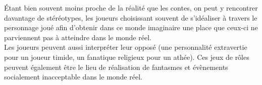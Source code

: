 Étant bien souvent moins proche de la réalité que les contes, on peut y rencontrer davantage de stéréotypes, les joueurs choisissant souvent de s'idéaliser à travers le personnage joué afin d'obtenir dans ce monde imaginaire une place que ceux-ci ne parviennent pas à atteindre dans le monde réel.\\
Les joueurs peuvent aussi interpréter leur opposé (une personnalité extravertie pour un joueur timide, un fanatique religieux pour un athée). Ces jeux de rôles peuvent également être le lieu de réalisation de fantasmes et évènements socialement inacceptable dans le monde réel.

\clearpage
